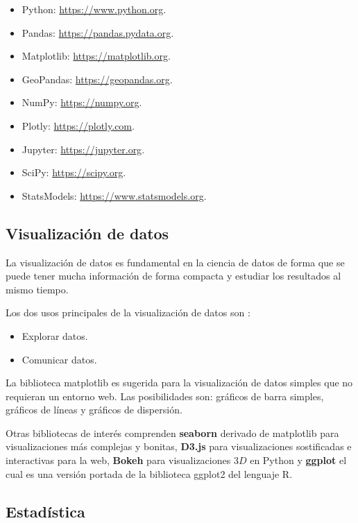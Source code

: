 \documentclass{report}
\begin{document}
\begin{itemize}
    \item Python: \url{https://www.python.org}.
    \item Pandas: \url{https://pandas.pydata.org}.
    \item Matplotlib: \url{https://matplotlib.org}.
    \item GeoPandas: \url{https://geopandas.org}.
    \item NumPy: \url{https://numpy.org}.
    \item Plotly: \url{https://plotly.com}.
    \item Jupyter: \url{https://jupyter.org}.
    \item SciPy: \url{https://scipy.org}.
    \item StatsModels: \url{https://www.statsmodels.org}.
\end{itemize}

\subsection{Visualización de datos}

La visualización de datos es fundamental en la ciencia de datos de forma que se puede tener mucha información de forma compacta y estudiar los resultados al mismo tiempo.

\bigbreak

Los dos usos principales de la visualización de datos son \cite{grus-2015}:

\begin{itemize}
    \item Explorar datos.
    \item Comunicar datos.
\end{itemize}

La biblioteca matplotlib es sugerida \cite{grus-2015} para la visualización de datos simples que no requieran un entorno web. Las posibilidades son: gráficos de barra simples, gráficos de líneas y gráficos de dispersión.

\bigbreak

Otras bibliotecas de interés comprenden \textbf{seaborn} derivado de matplotlib para visualizaciones más complejas y bonitas, \textbf{D3.js} para visualizaciones sostificadas e interactivas para la web, \textbf{Bokeh} para visualizaciones $3D$ en Python y \textbf{ggplot} el cual es una versión portada de la biblioteca ggplot2 del lenguaje R. 

\subsection{Estadística}
\end{document}

